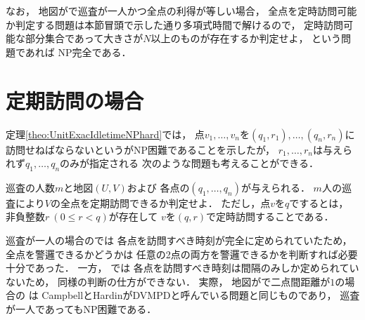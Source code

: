 なお，
地図が{\graphUnit}で巡査が一人かつ全点の利得が等しい場合，
全点を定時訪問可能か判定する問題は本節冒頭で示した通り多項式時間で解けるので，
定時訪問可能な部分集合であって大きさが$N$以上のものが存在するか判定せよ，
という問題であれば
NP完全である．




\section*{定期訪問の場合}

定理\ref{theo:UnitExacIdletimeNPhard}では，
点$v_1, \ldots, v_n$を{\exactTime}$(q_1, r_1), \ldots, (q_n, r_n)$に訪問せねばならないという{\timeSpecifiedPatProb}がNP困難であることを示したが，
$r_1, \ldots, r_n$は与えられず$q_1, \ldots, q_n$のみが指定される
次のような問題も考えることができる．

\begin{intervalSpecifiedPatrollingProblemDecision}
  巡査の人数$m$と地図$(U, V)$および
  各点の{\exactInterval}$(q_1, \ldots, q_n)$が与えられる．
  $m$人の巡査により$V$の全点を定期訪問できるか判定せよ．
  ただし，点$v$を$q$でするとは，
  非負整数$r\ (0 \leq r < q)$が存在して
  $v$を{\exactTime}$(q, r)$で定時訪問することである．
\end{intervalSpecifiedPatrollingProblemDecision}

巡査が一人の場合の{\timeSpecifiedPatProbDecision}では
各点を訪問すべき時刻が完全に定められていたため，
全点を警邏できるかどうかは
任意の2点の両方を警邏できるかを判断すれば必要十分であった．
一方，
{\intervalSpecifiedPatProbDecision}では
各点を訪問すべき時刻は間隔のみしか定められていないため，
同様の判断の仕方ができない．
実際，
地図が{\graphUnit}で二点間距離が$1$の場合の
{\intervalSpecifiedPatProbDecision}は
CampbellとHardin\cite{campbell2005vehicle}がDVMPDと呼んでいる問題と同じものであり，
巡査が一人であってもNP困難である\cite[Theorem~4]{campbell2005vehicle}．
